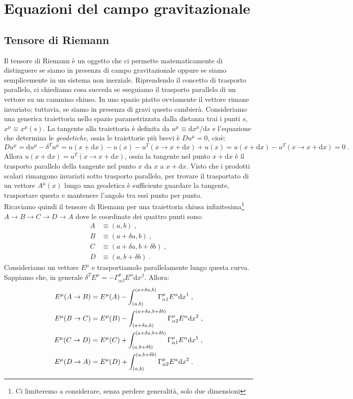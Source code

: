 \documentclass[12pt,a4paper]{report}
\theoremstyle{definition}
\newcommand{\diff}[1][]{\mathrm{d}#1}
\begin{document}
\chapter{Equazioni del campo gravitazionale}
\section{Tensore di Riemann}
Il tensore di Riemann è un oggetto che ci permette matematicamente di distinguere se siamo in presenza di campo gravitazionale oppure se siamo semplicemente in un sistema non inerziale. Riprendendo il concetto di trasporto parallelo, ci chiediamo cosa succeda se eseguiamo il trasporto parallelo di un vettore su un cammino chiuso. In uno spazio piatto ovviamente il vettore rimane invariato; tuttavia, se siamo in presenza di gravi questo cambierà. Consideriamo una generica traiettoria nello spazio parametrizzata dalla distanza trai i punti $s$, $x^{\mu}\equiv x^{\mu}(s)$. La tangente alla traiettoria è definita da $u^{\mu}\equiv \diff{x^{\mu}}/\diff{s}$ e l'equazione che determina le \emph{geodetiche}, ossia le traiettorie più brevi è $Du^{\mu}=0$, cioè:
$$
Du^{\mu}=\diff{u^{\mu}}-\delta^Tu^{\mu}=u(x+\diff{x})-u(x)-u^T(x\to x+\diff{x})+u(x)=u(x+\diff{x})-u^T(x\to x+\diff{x})=0\;.
$$
Allora $u(x+\diff{x})=u^T(x\to x+\diff{x})$, ossia la tangente nel punto $x+\diff{x}$ è il trasporto parallelo della tangente nel punto $x$ da $x$ a $x+\diff{x}$. Visto che i prodotti scalari rimangono invariati sotto trasporto parallelo, per trovare il trasportato di un vettore $A^{\mu}(x)$ lungo una geodetica è sufficiente guardare la tangente, trasportare questa e mantenere l'angolo tra essi punto per punto. \\
Ricaviamo quindi il tensore di Riemann per una traiettoria chiusa infinitesima\footnote{Ci limiteremo a considerare, senza perdere generalità, solo due dimensioni} $A\to B\to C\to D\to A$ dove le coordinate dei quattro punti sono:
\begin{align*}
A&\equiv (a,b)\;, \\
B&\equiv (a+\delta a,b)\;, \\
C&\equiv (a+\delta a,b+\delta b)\;, \\
D&\equiv (a,b+\delta b)\;.
\end{align*}
Consideriamo un vettore $E^{\mu}$ e trasportiamolo parallelamente lungo questa curva. Sappiamo che, in generale $\delta^TE^{\mu}=-\Gamma^{\mu}_{\alpha\beta}E^{\alpha}\diff{x^{\beta}}$. Allora:
\begin{align}
E^{\mu}(A\to B) &= E^{\mu}(A)-\int_{(a,b)}^{(a+\delta a,b)}\Gamma^{\mu}_{\alpha 1}E^{\alpha}\diff{x^1}\;, \notag \\
E^{\mu}(B\to C) &= E^{\mu}(B)-\int_{(a+\delta a,b)}^{(a+\delta a,b+\delta b)}\Gamma^{\mu}_{\alpha 2}E^{\alpha}\diff{x^2} \notag\;, \\
E^{\mu}(C\to D) &= E^{\mu}(C)+\int_{(a,b+\delta b)}^{(a+\delta a,b+\delta b)}\Gamma^{\mu}_{\alpha 1}E^{\alpha}\diff{x^1} \notag\;, \\
E^{\mu}(D\to A) &= E^{\mu}(D)+\int_{(a,b)}^{(a,b+\delta b)}\Gamma^{\mu}_{\alpha 2}E^{\alpha}\diff{x^2}\;.
\end{align}
\end{document}
